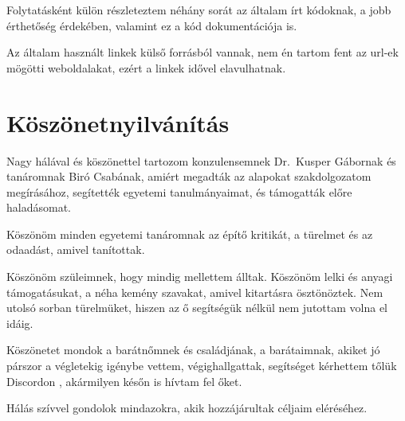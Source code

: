 \documentclass[
]{thesis-ekf}
\theoremstyle{definition}
\theoremstyle{remark}
\begin{document}
	Folytatásként külön részleteztem néhány sorát az általam írt kódoknak, a jobb érthetőség érdekében, valamint ez a kód dokumentációja is.

	Az általam használt linkek külső forrásból vannak, nem én tartom fent az url-ek mögötti weboldalakat, ezért a linkek idővel elavulhatnak.
	
\chapter*{Köszönetnyilvánítás}

	Nagy hálával és köszönettel tartozom konzulensemnek Dr.~Kusper Gábornak és tanáromnak Biró Csabának, amiért megadták az alapokat szakdolgozatom megírásához, segítették egyetemi tanulmányaimat, és támogatták előre haladásomat.

	Köszönöm minden egyetemi tanáromnak az építő kritikát, a türelmet és az odaadást, amivel tanítottak.
	
	Köszönöm szüleimnek, hogy mindig mellettem álltak. Köszönöm lelki és anyagi támogatásukat, a néha kemény szavakat, amivel kitartásra ösztönöztek. Nem utolsó sorban türelmüket, hiszen az ő segítségük nélkül nem jutottam volna el idáig.
	
	Köszönetet mondok a barátnőmnek és családjának, a barátaimnak, akiket jó párszor a végletekig igénybe vettem, végighallgattak, segítséget kérhettem tőlük Discordon \cite{dc}, akármilyen későn is hívtam fel őket.
	
	Hálás szívvel gondolok mindazokra, akik hozzájárultak céljaim eléréséhez.
	
\end{document}
